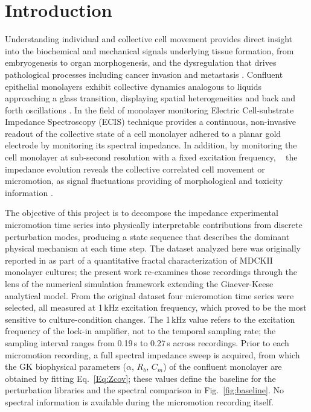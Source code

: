 \documentclass[english, 10pt, a4paper]{article}
\def\SI#1#2{#1\,#2}%
\begin{document}
\section{Introduction}
\label{sec:intro}

Understanding individual and collective cell movement provides direct insight into the biochemical and mechanical signals underlying tissue formation, from embryogenesis to organ morphogenesis, and the dysregulation that drives pathological processes including cancer invasion and metastasis \cite{trepat2009physical, matoz2017cell}. Confluent epithelial monolayers exhibit collective dynamics analogous to liquids approaching a glass transition, displaying spatial heterogeneities \cite{matoz2017cell,henkes2020dense} and back and forth oscillations \cite{petrolli2019confinement}. In the field of monolayer monitoring Electric Cell-substrate Impedance Spectroscopy (ECIS) technique provides a continuous, non-invasive readout of the collective state of a cell monolayer adhered to a planar gold electrode by monitoring its spectral impedance. In addition, by monitoring the cell monolayer at sub-second resolution with a fixed excitation frequency, ~\cite{giaever1991micromotion,giaever1993biosensor, keese1994biosensor,giana2018desarrollo} the impedance evolution reveals the collective correlated cell movement or micromotion, as signal fluctuations providing of morphological and toxicity information \cite{giaever1989fractal,lovelady2009detecting, tarantola2011toxicity,izzard1980formation, acerbo2024determining}. 

The objective of this project is to decompose the impedance experimental micromotion time series into physically interpretable contributions from discrete perturbation modes, producing a state sequence that describes the dominant physical mechanism at each time step. The dataset analyzed here was originally reported in \cite{acerbo2024determining} as part of a quantitative fractal characterization of MDCKII monolayer cultures; the present work re-examines those recordings through the lens of the numerical simulation framework extending the Giaever-Keese analytical model. From the original dataset four micromotion time series were selected, all measured at \SI{1}{kHz} excitation frequency, which proved to be the most sensitive to culture-condition changes. The \SI{1}{kHz} value refers to the excitation frequency of the lock-in amplifier, not to the temporal sampling rate; the sampling interval ranges from \SI{0.19}{s} to \SI{0.27}{s} across recordings. Prior to each micromotion recording, a full spectral impedance sweep is acquired, from which the GK biophysical parameters ($\alpha$, $R_b$, $C_m$) of the confluent monolayer are obtained by fitting Eq.~\ref{Eq:Zcov}; these values define the baseline for the perturbation libraries and the spectral comparison in Fig.~\ref{fig:baseline}. No spectral information is available during the micromotion recording itself.
\end{document}
